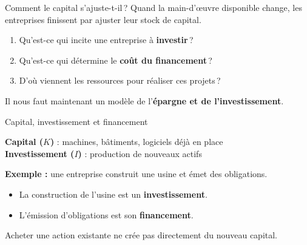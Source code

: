 \documentclass[aspectratio=169]{beamer}
\begin{document}

\begin{frame}[t]{Comment le capital s'ajuste-t-il\,?}
\vspace{0.3cm}
   Quand la main-d'œuvre disponible change, les entreprises finissent par ajuster leur stock de capital.
   \vspace{0.4cm}
   \begin{enumerate}
      \setlength\itemsep{0.3cm}
      \item Qu'est-ce qui incite une entreprise à \textbf{investir}\,?
      \item Qu'est-ce qui détermine le \textbf{coût du financement}\,?
      \item D'où viennent les ressources pour réaliser ces projets\,?
   \end{enumerate}
   \vspace{0.35cm}
   \begin{keyinsight}
      \RaggedRight
      Il nous faut maintenant un modèle de l'\textbf{épargne et de l'investissement}.
   \end{keyinsight}
\end{frame}




\begin{frame}[t]{Capital, investissement et financement}\examtag
   \begin{defbox}
      \RaggedRight\leavevmode{}%
      \textbf{Capital ($K$)} : machines, bâtiments, logiciels déjà en place\\[5pt]
      \textbf{Investissement ($I$)} : production de nouveaux actifs
   \end{defbox}
   \vspace{0.3cm}
   \textbf{Exemple :} une entreprise construit une usine et émet des obligations.
   \begin{itemize}
      \setlength\itemsep{0.15cm}
      \item La construction de l'usine est un \textbf{investissement}.
      \item L'émission d'obligations est son \textbf{financement}.
   \end{itemize}
   \vspace{0.2cm}
   Acheter une action existante ne crée pas directement du nouveau capital.
\end{frame}
\end{document}
